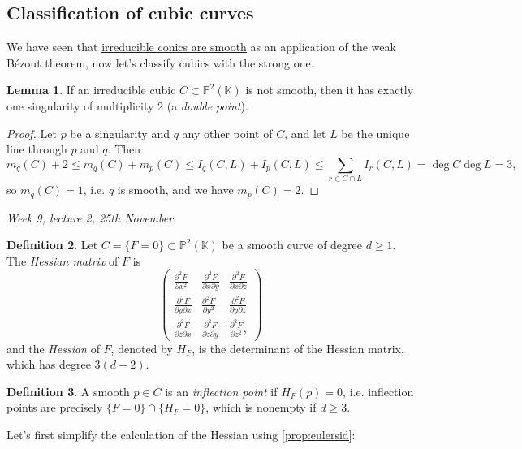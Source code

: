 \documentclass{article}
\newcommand{\K}{\mathbb{K}}
\newcommand{\p}{\mathbb{P}}
\theoremstyle{definition}
\newtheorem{defn}{Definition}[subsection]
\newtheorem{lemma}[defn]{Lemma}
\begin{document}
\subsection{Classification of cubic curves}
We have seen that \hyperref[thm:irredconicsaresmooth]{irreducible conics are smooth} as an application of the weak Bézout theorem, now let's classify cubics with the strong one.

\begin{lemma}
If an irreducible cubic $C\subset\p^2(\K)$ is not smooth, then it has exactly one singularity of multiplicity 2 (a \textit{double point}).
\end{lemma}
\begin{proof}
Let $p$ be a singularity and $q$ any other point of $C$, and let $L$ be the unique line through $p$ and $q$. Then
\[
m_q(C)+2\leq m_q(C)+m_p(C)\leq I_q(C,L)+I_p(C,L)\leq\sum_{r\in C\cap L}I_r(C,L)=\deg C\deg L=3,
\]
so $m_q(C)=1$, i.e. $q$ is smooth, and we have $m_p(C)=2$.
\end{proof}

\begin{flushright}
\textit{Week 9, lecture 2, 25th November}
\end{flushright}

\begin{defn}
Let $C=\{F=0\}\subset\p^2(\K)$ be a smooth curve of degree $d\geq 1$. The \textit{Hessian matrix} of $F$ is
\[
\begin{pmatrix}
\frac{\partial^2 F}{\partial x^2} & \frac{\partial^2 F}{\partial x\partial y} & \frac{\partial^2 F}{\partial x\partial z} \\
\frac{\partial^2 F}{\partial y\partial x} & \frac{\partial^2 F}{\partial y^2} & \frac{\partial^2 F}{\partial y\partial z} \\
\frac{\partial^2 F}{\partial z\partial x} & \frac{\partial^2 F}{\partial z\partial y} & \frac{\partial^2 F}{\partial z^2},
\end{pmatrix}
\]
and the \textit{Hessian} of $F$, denoted by $H_F$, is the determinant of the Hessian matrix, which has degree $3(d-2)$.
\end{defn}

\begin{defn}
A smooth $p\in C$ is an \textit{inflection point} if $H_F(p)=0$, i.e. inflection points are precisely $\{F=0\}\cap\{H_F=0\}$, which is nonempty if $d\geq 3$.
\end{defn}

Let's first simplify the calculation of the Hessian using \ref{prop:eulersid}:
\end{document}
